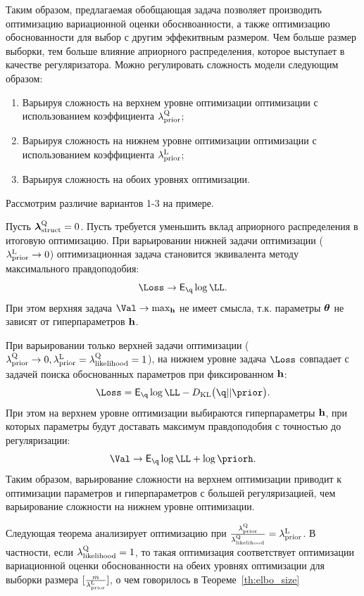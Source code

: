 Таким образом, предлагаемая обобщающая задача позволяет производить оптимизацию вариационной оценки обоснвоанности, а также оптимизацию обоснованности для выбор с другим эффекитвным размером. Чем больше размер выборки, тем больше влияние априорного распределения, которое выступает в качестве регуляризатора. Можно регулировать сложность модели следующим образом:
\begin{enumerate}
\item Варьируя сложность на верхнем уровне оптимизации оптимизации с использованием коэффициента $\lambda_\text{prior}^\text{Q}$;
\item Варьируя сложность на нижнем уровне оптимизации оптимизации с использованием коэффициента $\lambda_\text{prior}^\text{L}$;
\item Варьируя сложность на обоих уровнях оптимизации.
\end{enumerate}
Рассмотрим различие вариантов 1-3 на примере.
\begin{example}
Пусть $\boldsymbol{\lambda}_\text{struct}^\text{Q} = 0$.
Пусть требуется уменьшить вклад априорного распределения в итоговую оптимизацию.
При варьировании нижней задачи оптимизации ($\lambda_\text{prior}^\text{L} \to 0$) оптимизационная задача становится эквивалента методу максимального правдоподобия:
\[
   \Loss \to \E_{\q} \log \LL.
\]
При этом верхняя задача $\Val \to \max_{\h}$ не имеет смысла, т.к. параметры $\boldsymbol{\theta}$ не зависят от гиперпараметров $\mathbf{h}$.

При варьировании только верхней задачи оптимизации ($\lambda_\text{prior}^\text{Q} \to 0, \lambda_\text{prior}^\text{L} = \lambda_\text{likelihood}^\text{Q} = 1$), на нижнем уровне задача $\Loss$ совпадает с задачей поиска обоснованных параметров при фиксированном $\mathbf{h}$:
\[
   \Loss = \E_{\q} \log \LL - \KL{\q}{\prior}.
\]
При этом на верхнем уровне оптимизации выбираются гиперпараметры $\mathbf{h}$, при которых параметры будут доставать максимум правдоподобия с точностью до регуляризации:
\[
    \Val \to \E_{\q} \log \LL  + \log \priorh.
\]
Таким образом, варьирование сложности на верхнем оптимизации приводит к оптимизации параметров и гиперпараметров с большей регуляризацией, чем варьирование сложности на нижнем уровне оптимизации.
\end{example}

Следующая теорема анализирует оптимизацию при  $\frac{\lambda_\text{prior}^\text{Q}}{\lambda_\text{likelihood}^\text{Q}} = \lambda_\text{prior}^\text{L}$. В частности, если $\lambda_\text{likelihood}^\text{Q} = 1$, то такая оптимизация соответствует оптимизации вариационной оценки обоснованности на обеих уровнях оптимизации для выборки размера $[\frac{m}{\lambda_\text{prior}^\text{L}}]$, о чем говорилось в Теореме~\ref{th:elbo_size}


